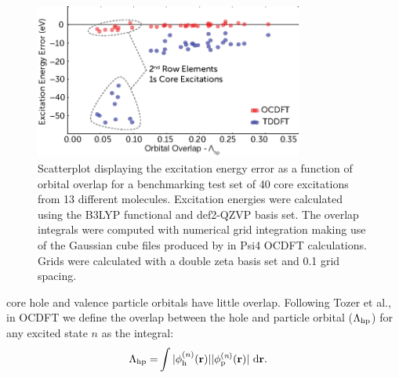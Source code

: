 \documentclass[12pt]{article}
\begin{document}
\begin{figure}[!t]
\centering
\includegraphics[width=8.8cm]{figure_5.eps}
\caption{Scatterplot displaying the excitation energy error as a function of orbital overlap for a benchmarking test set of 40 core excitations from 13 different molecules. Excitation energies were calculated using the B3LYP functional and def2-QZVP basis set. The overlap integrals were computed with numerical grid integration making use of the Gaussian cube files produced by in Psi4 OCDFT calculations. Grids were calculated with a double zeta basis set and 0.1 grid spacing.}
\label{figure:scatter}
\end{figure}
core hole and valence particle orbitals have little overlap. Following Tozer et al.,\cite{peach_excitation_2008} in OCDFT we define the overlap between the hole and particle orbital ($\Lambda_{\rm hp}$) for any excited state $n$ as the integral:
\begin{align}
\Lambda_{\rm hp} = &\int |\phi^{(n)}_{\rm h} (\bf{r})||\phi^{(\textit{n})}_{\rm p} (\bf{r})| \ \rm d\bf{r}  .
\end{align}

\end{document}
